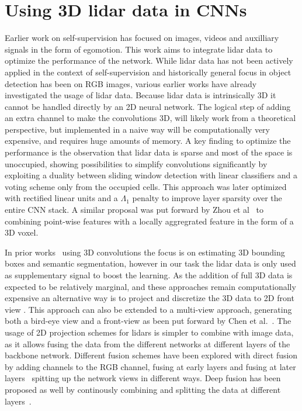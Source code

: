 \section{Using 3D lidar data in CNNs}
Earlier work on self-supervision has focused on images, videos and auxilliary signals in the form of egomotion. This work aims to integrate lidar data to optimize the performance of the network. While lidar data has not been actively applied in the context of self-supervision and historically general focus in object detection has been on RGB images, various earlier works have already investigated the usage of lidar data. Because lidar data is intrinsically 3D it cannot be handled directly by an 2D neural network. The logical step of adding an extra channel to make the convolutions 3D, will likely work from a theoretical perspective, but implemented in a naive way will be computationally very expensive, and requires huge amounts of memory. A key finding to optimize the performance is the observation that lidar data is sparse and most of the space is unoccupied\cite{wang2015vote}, showing possibilities to simplify convolutions significantly by exploiting a duality between sliding window detection with linear classifiers and a voting scheme only from the occupied cells. This approach was later optimized with rectified linear units and a $\Lambda_1$ penalty to improve layer sparsity over the entire CNN stack\cite{engelcke2017}. A similar proposal was put forward by Zhou et al~\cite{zhou2017voxelnet} to combining point-wise features with a locally aggregrated feature in the form of a 3D voxel. 

In prior works~\cite{engelcke2017,zhou2017voxelnet,wang2015} using 3D convolutions the focus is on estimating 3D bounding boxes and semantic segmentation, however in our task the lidar data is only used as supplementary signal to boost the learning. As the addition of full 3D data is expected to be relatively marginal, and these approaches remain computationally expensive\needref\cite{chen2017} an alternative way is to project and discretize the 3D data to 2D front view \cite{li2016}. This approach can also be extended to a multi-view approach, generating both a bird-eye view and a front-view as been put forward by Chen et al.~\cite{chen2017}. The usage of 2D projection schemes for lidars is simpler to combine with image data, as it allows fusing the data from the different networks at different layers of the backbone network. Different fusion schemes have been explored with direct fusion by adding channels to the RGB channel, fusing at early layers and fusing at later layers~\cite{schlosser2016} spitting up the network views in different ways. Deep fusion has been proposed as well by continously combining and splitting the data at different layers~\cite{chen2017}.  

